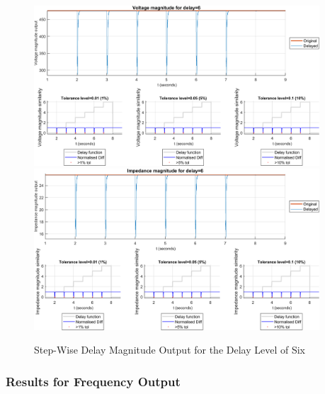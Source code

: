 \begin{figure}
    \caption{Step-Wise Delay Magnitude Output for the Delay Level of Six}
    \includegraphics[width=0.95\textwidth]{PMUsim-figures/DelayOf_6/Step_vMagnitude.png}    
      \includegraphics[width=0.95\textwidth]{PMUsim-figures/DelayOf_6/Step_iMagnitude.png}  
    \label{fig:PMUsimStep_Six_Magnitude}
    \begin{small}
     \end{small}

\end{figure}

\newpage \subsubsection{Results for Frequency Output}


